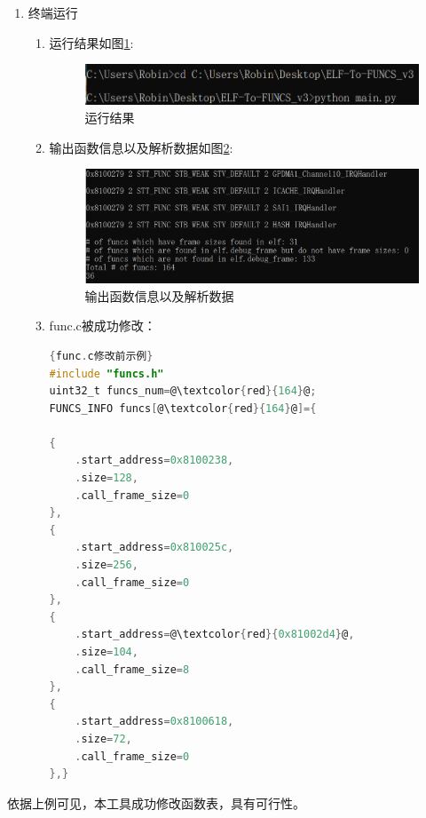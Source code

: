 \documentclass[12pt,a4paper]{ctexart}
\numberwithin{figure}{section}
\begin{document}
\begin{enumerate}
\begin{enumerate}
          \end{enumerate}
    \item 终端运行
          \begin{enumerate}
              \item 运行结果如图\ref{yx}:
                    \begin{figure}[H]
                        \centering
                        \includegraphics[scale=0.5]{graph/zhongduanjieguo.png}
                        \caption{运行结果}
                        \label{yx}
                    \end{figure}
              \item 输出函数信息以及解析数据如图\ref{sc}:
                    \begin{figure}[H]
                        \centering
                        \includegraphics[scale=0.3]{graph/shuchujieguo.png}
                        \caption{输出函数信息以及解析数据}
                        \label{sc}
                    \end{figure}
              \item func.c被成功修改：
                    \begin{lstlisting}[language=C]{func.c修改前示例}
#include "funcs.h"
uint32_t funcs_num=@\textcolor{red}{164}@;
FUNCS_INFO funcs[@\textcolor{red}{164}@]={

{
    .start_address=0x8100238,
    .size=128,
    .call_frame_size=0
},
{
    .start_address=0x810025c,
    .size=256,
    .call_frame_size=0
},
{
    .start_address=@\textcolor{red}{0x81002d4}@,
    .size=104,
    .call_frame_size=8
},
{
    .start_address=0x8100618,
    .size=72,
    .call_frame_size=0
},}
                    \end{lstlisting}
                    
                    
                    
          \end{enumerate}
\end{enumerate}
\par 依据上例可见，本工具成功修改函数表，具有可行性。
\end{document}
